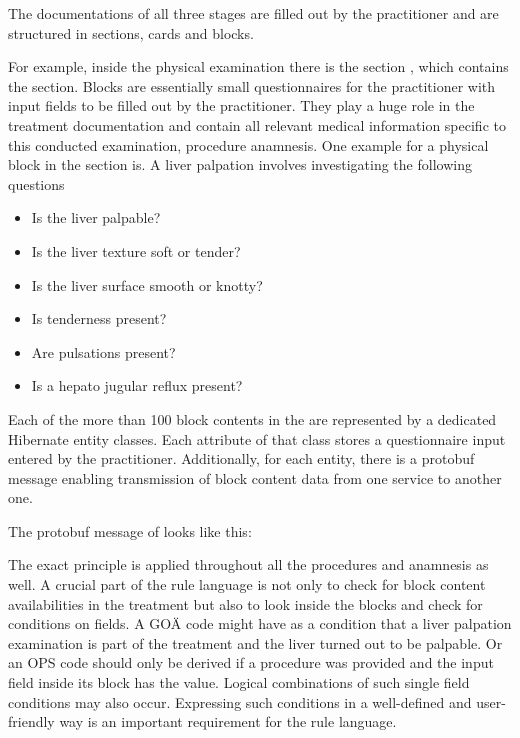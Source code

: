 The documentations of all three stages are filled out by the practitioner and are structured in sections,
cards and blocks.

For example, inside the physical examination there is the section ,
which contains the section.
Blocks are essentially small questionnaires for the practitioner with input fields to be filled out by the practitioner.
They play a huge role in the treatment documentation
and contain all relevant medical information specific to this conducted examination,
procedure anamnesis.
One example for a physical block in the section is.
A liver palpation involves investigating the following questions

\begin{itemize}
    \item Is the liver palpable?
    \item Is the liver texture soft or tender?
    \item Is the liver surface smooth or knotty?
    \item Is tenderness present?
    \item Are pulsations present?
    \item Is a hepato jugular reflux present?
\end{itemize}

Each of the more than 100 block contents in the \AVS are represented by a dedicated Hibernate entity classes.
Each attribute of that class stores a questionnaire input entered by the practitioner.
Additionally, for each entity, there is a protobuf message enabling transmission of block content data from one service
to another one.

The protobuf message of  looks like this:



The exact principle is applied throughout all the procedures and anamnesis as well.
A crucial part of the rule language is not only to check for block content availabilities in the treatment
but also to look inside the blocks and check for conditions on fields.
A GOÄ code might have as a condition that a liver palpation examination is part of the treatment and
the liver turned out to be palpable.
Or an OPS code should only be derived if a procedure was provided and the
input field inside its block has the value.
Logical combinations of such single field conditions may also occur.
Expressing such conditions in a well-defined and user-friendly way is an important requirement for the rule language.

